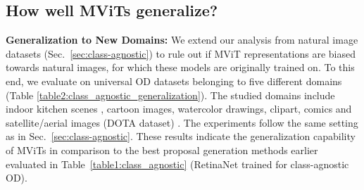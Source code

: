 \documentclass[runningheads]{llncs}
\begin{document}
\begin{table}[!t]
\caption{\small Class-agnostic OD performance of \colorbox{orange!6}{MViTs} in comparison with RetinaNet \cite{lin2017focal} on several out-of-domain datasets. MViTs show consistently good results on all datasets.  Proposals on DOTA \cite{dota} are generated by multi-scale inference (see Sec.~\ref{appendix:class_agnostic_evaluation}).}
\begin{center}
\setlength{\tabcolsep}{6pt}
\end{center}
\label{table2:class_agnostic_generalization}
\end{table}

\subsection{How well MViTs generalize?}

\noindent \textbf{Generalization to New Domains:}
We extend our analysis from natural image datasets (Sec.~\ref{sec:class-agnostic}) to rule out if MViT representations are biased towards natural images, for which these models are originally trained on. To this end, we evaluate on universal OD datasets \cite{universal} belonging to five different domains (Table \ref{table2:class_agnostic_generalization}). The studied domains include indoor kitchen scenes \cite{kitchen}, cartoon images, watercolor drawings, clipart, comics \cite{clipart-comic-water} and satellite/aerial images (DOTA dataset) \cite{dota}. The experiments follow the same setting as in Sec.~\ref{sec:class-agnostic}. These results indicate the generalization capability of MViTs in comparison to the best proposal generation methods earlier evaluated in Table~\ref{table1:class_agnostic} (RetinaNet trained for class-agnostic OD).
\end{document}
